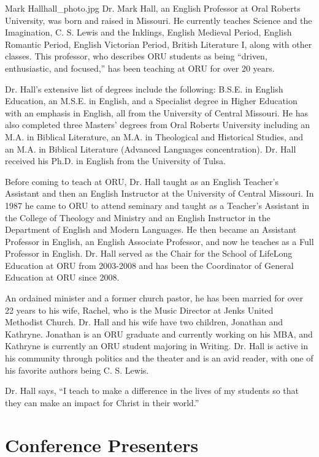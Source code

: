 \begin{authorbio}{Mark Hall}{hall_photo.jpg}
Dr. Mark Hall, an English Professor at Oral Roberts University, was born and raised in Missouri. He currently teaches Science and the Imagination, C. S. Lewis and the Inklings, English Medieval Period, English Romantic Period, English Victorian Period, British Literature I, along with other classes. This professor, who describes ORU students as being “driven, enthusiastic, and focused,” has been teaching at ORU for over 20 years.

Dr. Hall’s extensive list of degrees include the following: B.S.E. in English Education, an M.S.E. in English, and a Specialist degree in Higher Education with an emphasis in English, all from the University of Central Missouri.  He has also completed three Masters' degrees from Oral Roberts University including an M.A. in Biblical Literature, an M.A. in Theological and Historical Studies, and an M.A. in  Biblical Literature (Advanced Languages concentration).  Dr. Hall received his Ph.D. in English from the University of Tulsa.

Before coming to teach at ORU, Dr. Hall taught as an English Teacher’s Assistant and then an English Instructor at the University of Central Missouri.  In 1987 he came to ORU to attend seminary and taught as a Teacher’s Assistant in the College of Theology and Ministry and an English Instructor in the Department of English and Modern Languages.  He then became an Assistant Professor in English, an English Associate Professor, and now he teaches as a Full Professor in English.  Dr. Hall served as the Chair for the School of LifeLong Education at ORU from 2003-2008 and has been the Coordinator of General Education at ORU since 2008.

An ordained minister and a former church pastor, he has been married for over 22 years to his wife, Rachel, who is the Music Director at Jenks United Methodist Church. Dr. Hall and his wife have two children, Jonathan and Kathryne. Jonathan is an ORU graduate and currently working on his MBA, and Kathryne is currently an ORU student majoring in Writing.  Dr. Hall is active in his community through politics and the theater and is an avid reader, with one of his favorite authors being C. S. Lewis.

Dr. Hall says, “I teach to make a difference in the lives of my students so that they can make an impact for Christ in their world.”
\end{authorbio}

\section{Conference Presenters}


